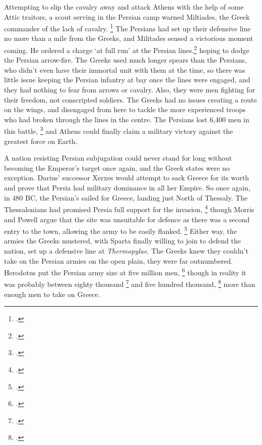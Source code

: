 \documentclass[twoside, a4paper, 12pt]{article}
\begin{document}
\par\vspace{1em}

Attempting to slip the cavalry away and attack Athens with the help of some
Attic traitors, a scout serving in the Persian camp warned Miltiades, the Greek
commander of the lack of cavalry.
\footcite[35]{green_darius_west}
The Persians had set up their defensive line
no more than a mile from the Greeks, and Militades sensed a victorious moment
coming. He ordered a charge `at full run' at the Persian lines,\footcite[Book 6.112]{herodotus_1920}
hoping to dodge the Persian arrow-fire.
The Greeks used much longer spears than the Persians, who didn't even have their
immortal unit with them at the time, so there was little issue keeping the
Persian infantry at bay once the lines were engaged, and they had nothing to
fear from arrows or cavalry. Also, they were men fighting for their freedom,
not conscripted soldiers. The Greeks had no issues creating a route on the wings,
and disengaged from here to tackle the more experienced troops who had broken
through the lines in the centre. The Persians lost 6,400 men in this battle,
\footcite[37]{green_darius_west} and
Athens could finally claim a military victory against the greatest force on Earth.


\par\vspace{1em}

A nation resisting Persian subjugation could never stand for long without
becoming the Emperor's target once again, and the Greek states were no
exception. Darius' successor Xerxes would attempt to sack Greece for its worth
and prove that Persia had military dominance in all her Empire. So once again, in 480 BC,
the Persian's sailed for Greece, landing just North of Thessaly. The Thessalonians
had promised Persia full support for the invasion, \footcite[52]{green_legacy_marathon}
though Morris and Powell argue that the site was unsuitable for defence
as there was a second entry to the town, allowing the army to be easily
flanked. \footcite[260]{morris_powell_2010} Either way, the armies the Greeks
mustered, with Sparta finally willing to join to defend the nation, set up
a defensive line at \emph{Thermopylae}. The Greeks knew they
couldn't take on the Persian armies on the open plain, they were far outnumbered.
Herodotus put the Persian army size at five million men,
\footcite[Book 7.185-6]{herodotus_1920}
though in reality it was probably between eighty thousand \footcite{kim_grecopersia_2017}
and five hundred thousand, \footcite[285]{morris_powell_2010} more than
enough men to take on Greece.
\end{document}
